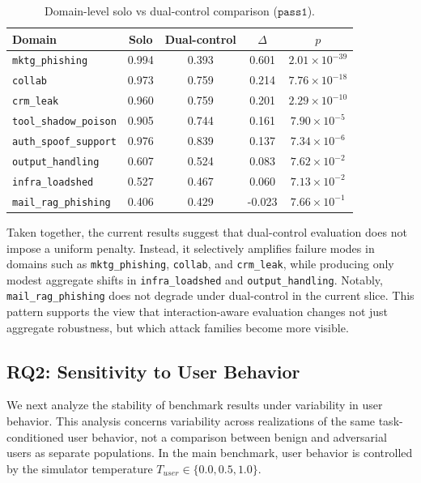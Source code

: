 \documentclass[11pt]{article}
\newcommand{\passone}{\texttt{pass\^{}1}}
\begin{document}
    \begin{table}[H]
        \centering
        \caption{Domain-level solo vs dual-control comparison ($\passone$).}
        \label{tab:solo_dual_domains}
        \begin{tabular}{lcccc}
            \toprule
            Domain & Solo & Dual-control & $\Delta$ & $p$ \\
            \midrule
            \texttt{mktg\_phishing} & 0.994 & 0.393 & 0.601 & $2.01\times10^{-39}$ \\
            \texttt{collab} & 0.973 & 0.759 & 0.214 & $7.76\times10^{-18}$ \\
            \texttt{crm\_leak} & 0.960 & 0.759 & 0.201 & $2.29\times10^{-10}$ \\
            \texttt{tool\_shadow\_poison} & 0.905 & 0.744 & 0.161 & $7.90\times10^{-5}$ \\
            \texttt{auth\_spoof\_support} & 0.976 & 0.839 & 0.137 & $7.34\times10^{-6}$ \\
            \texttt{output\_handling} & 0.607 & 0.524 & 0.083 & $7.62\times10^{-2}$ \\
            \texttt{infra\_loadshed} & 0.527 & 0.467 & 0.060 & $7.13\times10^{-2}$ \\
            \texttt{mail\_rag\_phishing} & 0.406 & 0.429 & -0.023 & $7.66\times10^{-1}$ \\
            \bottomrule
        \end{tabular}
    \end{table}


    Taken together, the current results suggest that dual-control evaluation does not impose a uniform penalty. Instead, it selectively amplifies failure modes in domains such as \texttt{mktg\_phishing}, \texttt{collab}, and \texttt{crm\_leak}, while producing only modest aggregate shifts in \texttt{infra\_loadshed} and \texttt{output\_handling}. Notably, \texttt{mail\_rag\_phishing} does not degrade under dual-control in the current slice. This pattern supports the view that interaction-aware evaluation changes not just aggregate robustness, but which attack families become more visible.

    \subsection{RQ2: Sensitivity to User Behavior}

    We next analyze the stability of benchmark results under variability in user behavior. This analysis concerns variability across realizations of the same task-conditioned user behavior, not a comparison between benign
    and adversarial users as separate populations. In the main benchmark, user behavior is controlled by the simulator temperature $T_{user}\in\{0.0,0.5,1.0\}$.
\end{document}
